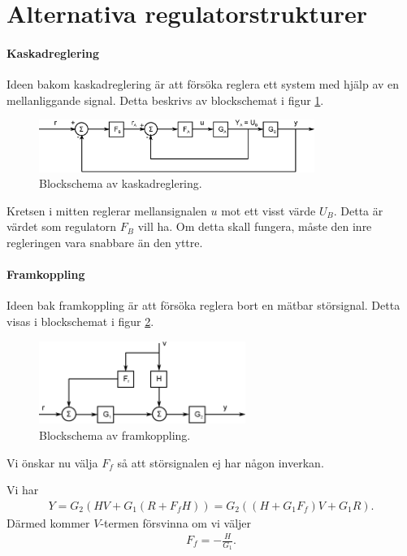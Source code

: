 \section{Alternativa regulatorstrukturer}

\paragraph{Kaskadreglering}
Ideen bakom kaskadreglering är att försöka reglera ett system med hjälp av en mellanliggande signal. Detta beskrivs av blockschemat i figur \ref{fig:cascade_control}.
\begin{figure}[!ht]
	\centering
	\includegraphics[width = 0.8\textwidth]{./Images/cascade_control.eps}
	\caption{Blockschema av kaskadreglering.}
	\label{fig:cascade_control}
\end{figure}
Kretsen i mitten reglerar mellansignalen $u$ mot ett visst värde $U_{B}$. Detta är värdet som regulatorn $F_{B}$ vill ha. Om detta skall fungera, måste den inre regleringen vara snabbare än den yttre.

\paragraph{Framkoppling}
Ideen bak framkoppling är att försöka reglera bort en mätbar störsignal. Detta visas i blockschemat i figur \ref{fig:forward_connection}.
\begin{figure}[!ht]
	\centering
	\includegraphics[width = 0.6\textwidth]{./Images/forward_connection.eps}
	\caption{Blockschema av framkoppling.}
	\label{fig:forward_connection}
\end{figure}
Vi önskar nu välja $F_{f}$ så att störsignalen ej har någon inverkan.

Vi har
\begin{align*}
	Y = G_{2}(HV + G_{1}(R + F_{f}H)) = G_{2}((H + G_{1}F_{f})V + G_{1}R).
\end{align*}
Därmed kommer $V$-termen försvinna om vi väljer
\begin{align*}
	F_{f} = -\frac{H}{G_{1}}.
\end{align*}

